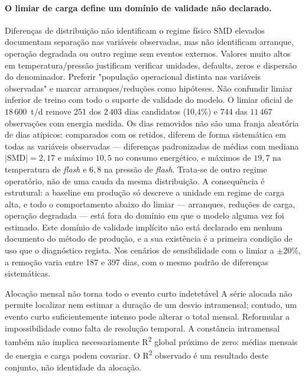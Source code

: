 \paragraph{O limiar de carga define um domínio de validade não declarado.}
{Diferenças de distribuição não identificam o regime físico}
{SMD elevados documentam separação nas variáveis observadas, mas não
identificam arranque, operação degradada ou outro regime sem eventos
externos. Valores muito altos em temperatura/pressão justificam verificar
unidades, defaults, zeros e dispersão do denominador. Preferir
"população operacional distinta nas variáveis observadas" e marcar
arranques/reduções como hipóteses. Não confundir limiar inferior de
treino com todo o suporte de validade do modelo.}%
O limiar oficial de $18\,600$~t/d remove 251 dos $2\,403$ dias candidatos
(10{,}4\%) e 744 das $11\,467$ observações com energia medida. Os dias
removidos não são uma franja aleatória de dias atípicos: comparados com os
retidos, diferem de forma sistemática em todas as variáveis observadas ---
diferenças padronizadas de médias com mediana $|\mathrm{SMD}|=2{,}17$ e máximo
$10{,}5$ no consumo energético, e máximos de $19{,}7$ na temperatura de
\emph{flash} e $6{,}8$ na pressão de \emph{flash}. Trata-se de outro regime
operatório, não de uma cauda da mesma distribuição. A consequência é
estrutural: a baseline em produção só descreve a unidade em regime de carga
alta, e todo o comportamento abaixo do limiar --- arranques, reduções de
carga, operação degradada --- está fora do domínio em que o modelo alguma vez
foi estimado. Este domínio de validade implícito não está declarado em nenhum
documento do método de produção, e a sua existência é a primeira condição de
uso que o diagnóstico regista. Nos cenários de sensibilidade com o limiar a
$\pm 20\%$, a remoção varia entre 187 e 397 dias, com o mesmo padrão de
diferenças sistemáticas.

{Alocação mensal não torna todo o evento curto indetetável}
{A série alocada não permite localizar nem estimar a duração de um desvio
intramensal; contudo, um evento curto suficientemente intenso pode alterar
o total mensal. Reformular a impossibilidade como falta de resolução
temporal. A constância intramensal também não implica necessariamente R\textsuperscript{2}
global próximo de zero: médias mensais de energia e carga podem covariar.
O R\textsuperscript{2} observado é um resultado deste conjunto, não identidade da alocação.}%
